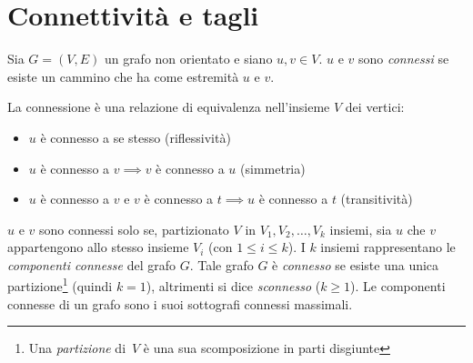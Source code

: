 \section{Connettività e tagli}
\begin{defn} Sia $G=(V,E)$ un grafo non orientato 
	e siano $u,v \in V$. $u$ e $v$ sono \emph{connessi} se esiste 
	un cammino che ha come estremità $u$ e $v$.
\end{defn}
\noindent La connessione è una relazione di equivalenza nell'insieme $V$ dei vertici:
\begin{itemize}
	\item{$u$ è connesso a se stesso (riflessività)}
	\item{$u$ è connesso a $v \implies v$ è connesso a $u$ (simmetria)}
	\item{$u$ è connesso a $v$ e $v$ è connesso a $t \implies u$ è connesso a $t$ (transitività)}
\end{itemize}
$u$ e $v$ sono connessi solo se, partizionato $V$ in $V_1, V_2, \dots, V_k$ insiemi, sia $u$
che $v$ appartengono allo stesso insieme $V_i$ (con $1 \leqslant i \leqslant k$).
I $k$ insiemi rappresentano le \emph{componenti connesse} del grafo $G$. Tale grafo
$G$ è \emph{connesso} se esiste una unica partizione\footnote{Una \emph{partizione} di~$V$ è una
	sua scomposizione in parti disgiunte} (quindi $k = 1$), altrimenti si dice
\emph{sconnesso} ($k \geqslant 1$). Le componenti connesse di un grafo sono i suoi sottografi
connessi massimali.

